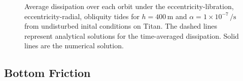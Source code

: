 \begin{figure}[!t]
\begin{subfigure}{\linewidth}
\subcaption{\label{fig:diss_c}}
\end{subfigure}
\vspace*{-0.8cm}
\caption{Average dissipation over each orbit under the eccentricity-libration, eccentricity-radial, obliquity tides for $h = 400 \, \si{\metre}$ and $\alpha = 1 \times 10^{-7} \, \si{\per\second}$ from undisturbed inital conditions on Titan. The dashed lines represent analytical solutions for the time-averaged dissipation. Solid lines are the numerical solution. \label{fig:diss}}
\end{figure}

%


\subsection{Bottom Friction \label{subsec:result_bottom}}

